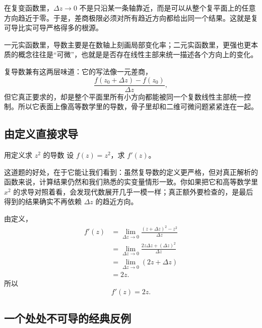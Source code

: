 \begin{jinshi}[这里真正严格的地方在哪里]
在复变函数里，$\Delta z\to 0$ 不是只沿某一条轴靠近，而是可以从整个复平面上的任意方向趋近于零。于是，差商极限必须对所有趋近方向都给出同一个结果。这就是复可导比实可导严格得多的根源。
\end{jinshi}

\begin{tishi}
一元实函数里，导数主要是在数轴上刻画局部变化率；二元实函数里，更强也更本质的概念往往是``可微''，也就是是否存在线性主部来统一描述各个方向上的变化。

复导数兼有这两层味道：它的写法像一元差商，
\[
    \frac{f(z_0+\Delta z)-f(z_0)}{\Delta z},
\]
但它真正要求的，却是整个平面里所有小方向都能被同一个复数线性主部统一控制。所以它表面上像高等数学里的导数，骨子里却和二维可微问题紧紧连在一起。
\end{tishi}

\subsection{由定义直接求导}

\begin{lizi}{用定义求 $z^2$ 的导数}{}
设 $f(z)=z^2$，求 $f'(z)$。

\begin{jie}
这道题的好处，在于它能让我们看到：虽然复导数的定义更严格，但对真正解析的函数来说，计算结果仍然和我们熟悉的实变量情形一致。你如果把它和高等数学里 $x^2$ 的求导对照着看，会发现代数展开几乎一模一样；真正额外要检查的，是最后得到的结果确实不再依赖 $\Delta z$ 的趋近方向。

由定义，
\begin{align*}
    f'(z)
    &=\lim_{\Delta z\to 0}\frac{(z+\Delta z)^2-z^2}{\Delta z}\\
    &=\lim_{\Delta z\to 0}\frac{2z\Delta z+(\Delta z)^2}{\Delta z}\\
    &=\lim_{\Delta z\to 0}(2z+\Delta z)\\
    &=2z.
\end{align*}
所以
\[
    f'(z)=2z.
\]
\end{jie}
\end{lizi}

\subsection{一个处处不可导的经典反例}

